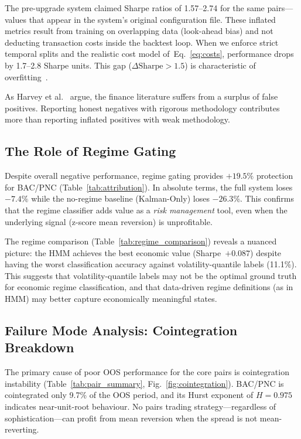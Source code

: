 \documentclass{ieeeaccess}
\begin{document}
The pre-upgrade system claimed Sharpe ratios of 1.57--2.74 for the same pairs---values that appear in the system's original configuration file.
These inflated metrics result from training on overlapping data (look-ahead bias) and not deducting transaction costs inside the backtest loop.
When we enforce strict temporal splits and the realistic cost model of~Eq.~\eqref{eq:costs}, performance drops by 1.7--2.8 Sharpe units.
This gap ($\Delta\text{Sharpe} > 1.5$) is characteristic of overfitting~\cite{harvey2016crosssection}.

As Harvey et al.~\cite{harvey2016crosssection} argue, the finance literature suffers from a surplus of false positives.
Reporting honest negatives with rigorous methodology contributes more than reporting inflated positives with weak methodology.

\subsection{The Role of Regime Gating}

Despite overall negative performance, regime gating provides $+19.5\%$ protection for BAC/PNC (Table~\ref{tab:attribution}).
In absolute terms, the full system loses $-7.4\%$ while the no-regime baseline (Kalman-Only) loses $-26.3\%$.
This confirms that the regime classifier adds value as a \emph{risk management} tool, even when the underlying signal (z-score mean reversion) is unprofitable.

The regime comparison (Table~\ref{tab:regime_comparison}) reveals a nuanced picture: the HMM achieves the best economic value (Sharpe~$+0.087$) despite having the worst classification accuracy against volatility-quantile labels (11.1\%).
This suggests that volatility-quantile labels may not be the optimal ground truth for economic regime classification, and that data-driven regime definitions (as in HMM) may better capture economically meaningful states.

\subsection{Failure Mode Analysis: Cointegration Breakdown}

The primary cause of poor OOS performance for the core pairs is cointegration instability (Table~\ref{tab:pair_summary}, Fig.~\ref{fig:cointegration}).
BAC/PNC is cointegrated only 9.7\% of the OOS period, and its Hurst exponent of $H = 0.975$ indicates near-unit-root behaviour.
No pairs trading strategy---regardless of sophistication---can profit from mean reversion when the spread is not mean-reverting.
\end{document}
